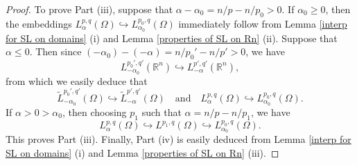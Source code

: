 \documentclass[reqno,centertags,11pt]{amsart}
\theoremstyle{definition}
\numberwithin{thm}{section}
\numberwithin{equation}{section}
\newcommand{\R}{{\mathbb{R}}}
\begin{document}
\begin{proof}
To prove Part (iii), suppose  that $\alpha-\alpha_0 = n/p-n/p_0 >0$. If $\alpha_0 \ge 0$, then the embeddings   $ L_\alpha^{p,q}(\Omega )  \hookrightarrow    L_{\alpha_0}^{p_0,q }(\Omega )
$  immediately follow   from Lemma \ref{interp for SL on domains} (i) and Lemma \ref{properties of SL on Rn} (ii). Suppose   that $\alpha \le 0$. Then since $(-\alpha_0) -( -\alpha) = n/p_0' - n/p' > 0$, we have
 $$
L_{-\alpha_0}^{p_0',q'}(\R^n )  \hookrightarrow    L_{-\alpha}^{p',q'}(\R^n ) ,
$$
from which we easily deduce  that
\[
\widetilde{L}_{-\alpha_0}^{p_0',q'}(\Omega )  \hookrightarrow  \widetilde{L}_{-\alpha}^{p',q  '}(\Omega )
\quad\text{and}\quad
L_\alpha^{p,q}(\Omega )
 \hookrightarrow L_{\alpha_0}^{p_0,q }(\Omega )   .
\]
If $\alpha>0 > \alpha_0$, then choosing $p_1$ such that $\alpha=n/p-n/p_1$,  we have
$$
L_\alpha^{p,q}(\Omega )
 \hookrightarrow L^{p_1,q }(\Omega )
 \hookrightarrow L_{\alpha_0}^{p_0,q }(\Omega ) .
$$
This proves Part (iii).
Finally, Part (iv) is easily deduced from  Lemma \ref{interp for SL on domains} (i)  and Lemma \ref{properties of SL on Rn} (iii).
\end{proof}



\end{document}
